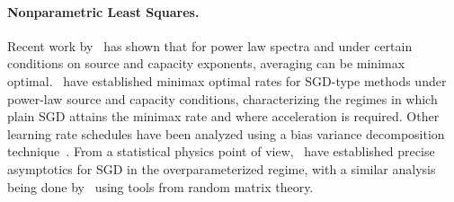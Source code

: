 \documentclass{article}
\theoremstyle{plain}
\begin{document}
\paragraph{Nonparametric Least Squares.} Recent work by~\citet{zhang2024does} has shown that for power law spectra and under certain conditions on source and capacity exponents, averaging can be minimax optimal.~\citet{zhang2024optimality} have
established minimax optimal rates for SGD-type methods under power-law
source and capacity conditions, characterizing the regimes in which plain
SGD attains the minimax rate and where acceleration is required. Other learning rate schedules have been analyzed using a bias variance decomposition technique~\citep{zou2023benign, wu2022last, wu2022power, meterez2025simplified}. From a statistical physics point of view,~\citet{bordelon2021learning} have established precise asymptotics for SGD in the overparameterized regime, with a similar analysis being done by~\citet{atanasov2024scaling, atanasov2025two} using tools from random matrix theory. 
\begin{table}[!t]
    \centering
    \setlength{\tabcolsep}{5pt}
    \renewcommand{\arraystretch}{1.2}
    \caption{Excess-risk rates for SGD in infinite dimensional linear regression and closely related models. We use capacity exponent $a$ and source exponent $b$. Horizon-free means that the learning rate scheduler does not depend on the training horizon $N$. Rates are presented up to constants and logarithmic factors. }
    \label{tab:related_rates}
\end{table}
\end{document}
